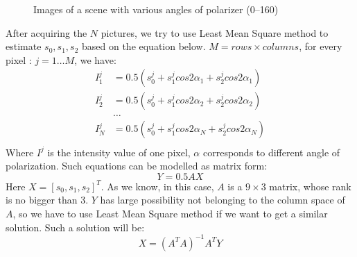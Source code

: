 \documentclass[english]{article}
\begin{document}
\begin{figure}[H]
{	}
	\caption{Images of a scene with various angles of polarizer (0\textdegree --160\textdegree)}
	\label{fig:three}
\end{figure}

After acquiring the $N$ pictures, we try to use Least Mean Square method to estimate $s_{0}, s_{1}, s_{2}$ based on the equation below. $M = rows\times columns$, for every pixel : $j = 1\dots M $, we have:
\begin{align*} 
	I^j_{1} &= 0.5(s^j_{0} + s^j_{1} cos2\alpha_{1} + s^j_{2} cos2\alpha_{1})\\
	I^j_{2} &= 0.5(s^j_{0} + s^j_{1} cos2\alpha_{2} + s^j_{2} cos2\alpha_{2})\\
	 &\dots \\
	I^j_{N} &= 0.5(s^j_{0} + s^j_{1} cos2\alpha_{N} + s^j_{2} cos2\alpha_{N})\\
\end{align*}
Where $I^j$ is the intensity value of one pixel, $\alpha$ corresponds to different angle of polarization. Such equations can be modelled as matrix form:
$$
Y = 0.5AX
$$
Here $X = [s_{0}, s_{1}, s_{2}]^T$. As we know, in this case, $A$ is a $9\times3$ matrix, whose rank is no bigger than 3. $Y$ has large possibility not belonging to the column space of $A$, so we have to use Least Mean Square method if we want to get a similar solution. Such a solution will be:
$$
X = (A^TA)^{-1}A^TY
$$
\end{document}
